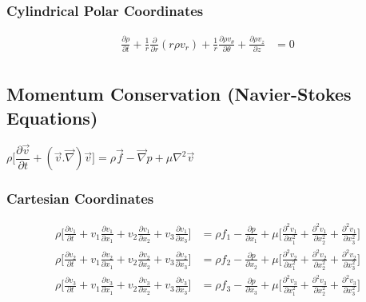 \documentclass[11pt, letterpaper, notitlepage]{article}
\begin{document}
\subsubsection{Cylindrical Polar Coordinates}
\begin{align*}
\frac{\partial \rho}{\partial t} + \frac{1}{r} \frac{\partial}{\partial r} (r \rho v_r) + \frac{1}{r} \frac{\partial \rho v_{\theta}}{\partial \theta} + \frac{\partial \rho v_z}{\partial z} &= 0 \\
\end{align*}

\subsection{Momentum Conservation (Navier-Stokes Equations)}
$\rho \biggl[\dfrac{\partial{\vec{v}}}{\partial t} + (\vec{v}.\vec{\nabla})\vec{v}\biggr] = \rho \vec{f} -\vec{\nabla} p + \mu \nabla^2 \vec{v}$

\subsubsection{Cartesian Coordinates}
\begin{align*}
\rho \biggl[ \frac{\partial v_1}{\partial t} + v_1 \frac{\partial v_1}{\partial x_1} + v_2 \frac{\partial v_1}{\partial x_2} + v_3 \frac{\partial v_1}{\partial x_3} \biggr] &= \rho f_1 - \frac{\partial p}{\partial x_1} + \mu \biggl[ \frac{\partial^2 v_1}{\partial x^2_1} + \frac{\partial^2 v_1}{\partial x^2_2} + \frac{\partial^2 v_1}{\partial x^2_3} \biggr] \\
\rho \biggl[ \frac{\partial v_2}{\partial t} + v_1 \frac{\partial v_2}{\partial x_1} + v_2 \frac{\partial v_2}{\partial x_2} + v_3 \frac{\partial v_2}{\partial x_3} \biggr] &= \rho f_2 - \frac{\partial p}{\partial x_2} + \mu \biggl[ \frac{\partial^2 v_2}{\partial x^2_1} + \frac{\partial^2 v_2}{\partial x^2_2} + \frac{\partial^2 v_2}{\partial x^2_3} \biggr] \\
\rho \biggl[ \frac{\partial v_3}{\partial t} + v_1 \frac{\partial v_3}{\partial x_1} + v_2 \frac{\partial v_3}{\partial x_2} + v_3 \frac{\partial v_3}{\partial x_3} \biggr] &= \rho f_3 - \frac{\partial p}{\partial x_3} + \mu \biggl[ \frac{\partial^2 v_3}{\partial x^2_1} + \frac{\partial^2 v_3}{\partial x^2_2} + \frac{\partial^2 v_3}{\partial x^2_3} \biggr] \\
\end{align*}
\end{document}
